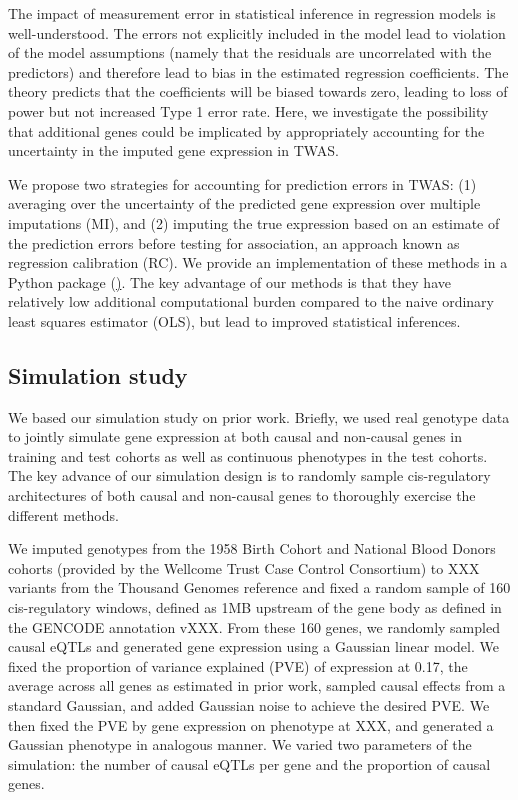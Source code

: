 \documentclass{article}
\begin{document}
The impact of measurement error in statistical inference in regression models
is well-understood\cite{fuller1987}. The errors not explicitly included in the
model lead to violation of the model assumptions (namely that the residuals are
uncorrelated with the predictors) and therefore lead to bias in the estimated
regression coefficients. The theory predicts that the coefficients will be
biased towards zero, leading to loss of power but not increased Type 1 error
rate. Here, we investigate the possibility that additional genes could be
implicated by appropriately accounting for the uncertainty in the imputed gene
expression in TWAS.

We propose two strategies for accounting for prediction errors in TWAS: (1)
averaging over the uncertainty of the predicted gene expression over multiple
imputations (MI), and (2) imputing the true expression based on an estimate of
the prediction errors before testing for association, an approach known as
regression calibration (RC). We provide an implementation of these methods in a
Python package (\href{https://github.com/Schork-Lab/mediator-was}). The key
advantage of our methods is that they have relatively low additional
computational burden compared to the naive ordinary least squares estimator
(OLS), but lead to improved statistical inferences.

\subsection{Simulation study}

We based our simulation study on prior work\cite{10.1038/ng.3506}. Briefly, we
used real genotype data to jointly simulate gene expression at both causal and
non-causal genes in training and test cohorts as well as continuous phenotypes
in the test cohorts. The key advance of our simulation design is to randomly
sample cis-regulatory architectures of both causal and non-causal genes to
thoroughly exercise the different methods.

We imputed genotypes from the 1958 Birth Cohort and National Blood Donors
cohorts (provided by the Wellcome Trust Case Control Consortium) to XXX
variants from the Thousand Genomes reference and fixed a random sample of 160
cis-regulatory windows, defined as 1MB upstream of the gene body as defined in
the GENCODE annotation vXXX. From these 160 genes, we randomly sampled causal
eQTLs and generated gene expression using a Gaussian linear model. We fixed the
proportion of variance explained (PVE) of expression at 0.17, the average
across all genes as estimated in prior
work\cite{10.1038/ng.3367,10.1038/ng.3506}, sampled causal effects from a
standard Gaussian, and added Gaussian noise to achieve the desired PVE. We then
fixed the PVE by gene expression on phenotype at XXX, and generated a Gaussian
phenotype in analogous manner. We varied two parameters of the simulation: the
number of causal eQTLs per gene and the proportion of causal genes.
\end{document}
